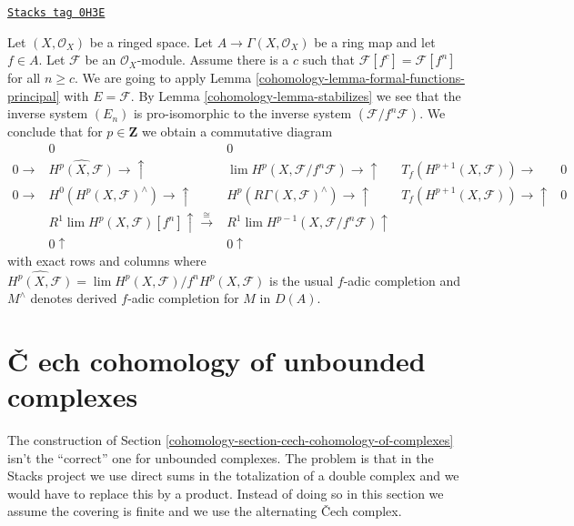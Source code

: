 \begin{example}
\label{cohomology-example-formal-functions-principal}
\href{https://stacks.math.columbia.edu/tag/0H3E}{\texttt{Stacks tag 0H3E}}

Let $(X, \mathcal{O}_X)$ be a ringed space. Let $A \to \Gamma(X, \mathcal{O}_X)$
be a ring map and let $f \in A$. Let $\mathcal{F}$ be an $\mathcal{O}_X$-module.
Assume there is a $c$ such that $\mathcal{F}[f^c] = \mathcal{F}[f^n]$
for all $n \geq c$. We are going to apply
Lemma \ref{cohomology-lemma-formal-functions-principal} with
$E = \mathcal{F}$. By Lemma \ref{cohomology-lemma-stabilizes} we see that
the inverse system $(E_n)$ is pro-isomorphic to the inverse system
$(\mathcal{F}/f^n\mathcal{F})$. We conclude that for $p \in \mathbf{Z}$
we obtain a commutative diagram
$$
\begin{array}{ccccc} & 0 & 0 &  &  \\ 0 \longrightarrow & \widehat{H^p(X, \mathcal{F})} \longrightarrow\uparrow & \lim H^p(X, \mathcal{F}/f^n\mathcal{F}) \longrightarrow\uparrow & T_f(H^{p + 1}(X, \mathcal{F})) \longrightarrow & 0 \\ 0 \longrightarrow & H^0(H^p(X, \mathcal{F})^\wedge) \longrightarrow\uparrow & H^p(R\Gamma(X, \mathcal{F})^\wedge) \longrightarrow\uparrow & T_f(H^{p + 1}(X, \mathcal{F})) \longrightarrow\uparrow & 0 \\  & R^1\lim H^p(X, \mathcal{F})[f^n] \uparrow\overset{\cong}{\longrightarrow} & R^1\lim H^{p - 1}(X, \mathcal{F}/f^n\mathcal{F}) \uparrow &  &  \\  & 0 \uparrow & 0 \uparrow &  & \end{array}
$$
with exact rows and columns where
$\widehat{H^p(X, \mathcal{F})} =
\lim H^p(X, \mathcal{F})/f^n H^p(X, \mathcal{F})$
is the usual $f$-adic completion
and $M^\wedge$ denotes derived $f$-adic completion
for $M$ in $D(A)$.
\end{example}

\section{{\v C}
ech cohomology of unbounded complexes}
\label{cohomology-section-cech-cohomology-of-unbounded-complexes}

The construction of Section \ref{cohomology-section-cech-cohomology-of-complexes}
isn't the ``correct'' one for unbounded complexes. The problem is that
in the Stacks project we use direct sums in the totalization of a
double complex and we would have to replace this by a product. Instead
of doing so in this section we assume the covering is finite and
we use the alternating {\v C}ech complex.

